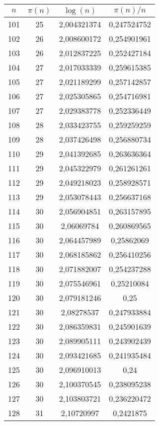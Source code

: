 {\begin{minipage}[!h]{0.45\textwidth}\centering
\tiny
\begin{longtable}{cccc} \hline
\(n\) & \(\pi(n)\) & \(\log(n)\) & \(\pi(n)/n\) \\ \hline
101 & 25 & 2,004321374 & 0,247524752 \\ \hline
102 & 26 & 2,008600172 & 0,254901961 \\ \hline
103 & 26 & 2,012837225 & 0,252427184 \\ \hline
104 & 27 & 2,017033339 & 0,259615385 \\ \hline
105 & 27 & 2,021189299 & 0,257142857 \\ \hline
106 & 27 & 2,025305865 & 0,254716981 \\ \hline
107 & 27 & 2,029383778 & 0,252336449 \\ \hline
108 & 28 & 2,033423755 & 0,259259259 \\ \hline
109 & 28 & 2,037426498 & 0,256880734 \\ \hline
110 & 29 & 2,041392685 & 0,263636364 \\ \hline
111 & 29 & 2,045322979 & 0,261261261 \\ \hline
112 & 29 & 2,049218023 & 0,258928571 \\ \hline
113 & 29 & 2,053078443 & 0,256637168 \\ \hline
114 & 30 & 2,056904851 & 0,263157895 \\ \hline
115 & 30 & 2,06069784 & 0,260869565 \\ \hline
116 & 30 & 2,064457989 & 0,25862069 \\ \hline
117 & 30 & 2,068185862 & 0,256410256 \\ \hline
118 & 30 & 2,071882007 & 0,254237288 \\ \hline
119 & 30 & 2,075546961 & 0,25210084 \\ \hline
120 & 30 & 2,079181246 & 0,25 \\ \hline
121 & 30 & 2,08278537 & 0,247933884 \\ \hline
122 & 30 & 2,086359831 & 0,245901639 \\ \hline
123 & 30 & 2,089905111 & 0,243902439 \\ \hline
124 & 30 & 2,093421685 & 0,241935484 \\ \hline
125 & 30 & 2,096910013 & 0,24 \\ \hline
126 & 30 & 2,100370545 & 0,238095238 \\ \hline
127 & 30 & 2,103803721 & 0,236220472 \\ \hline
128 & 31 & 2,10720997 & 0,2421875 \\ \hline

\end{longtable}
\end{minipage}}
